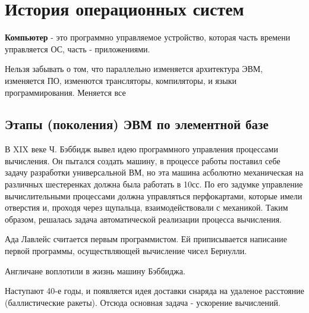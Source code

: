 \documentclass[14pt, a4paper]{article}
\begin{document}
	
	
	\section*{История операционных систем}
	
	{\bf Компьютер} - это программно управляемое устройство,
	которая часть времени управляется ОС, часть - приложениями.
	
	Нельзя забывать о том, что параллельно изменяется архитектура ЭВМ,
	изменяется ПО, изменются трансляторы, компиляторы, и языки программирования. Меняется все
	
	\subsection*{Этапы (поколения) ЭВМ по элементной базе}
	
	В XIX веке Ч. Бэббидж вывел идею программного управления процессами вычисления.
	Он пытался создать машину, в процессе работы поставил себе задачу разработки универсальной
	ВМ, но эта машина асболютно механическая на различных шестеренках должна была работать
	в 10сс. По его задумке управление вычислительными процессами должна управляться перфокартами,
	которые имели отверстия и, проходя через щупальца, взаимодействовали с механикой. Таким образом,
	решалась задача автоматической реализации процесса вычисления.
	
	Ада Лавлейс считается первым программистом. Ей приписывается написание первой программы, осуществляющей
	вычисление чисел Бернулли.
	
	Англичане воплотили в жизнь машину Бэббиджа.
	
	Наступают 40-е годы, и появляется идея доставки снаряда на удаленое расстояние (баллистические ракеты).
	Отсюда основная задача - ускорение вычислений.
	
\end{document}
